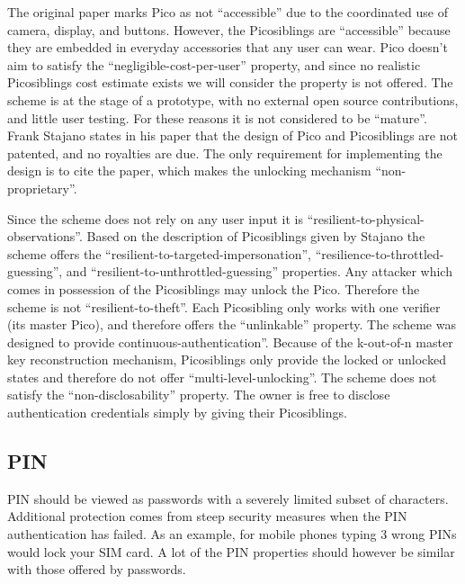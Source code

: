 	The original paper marks Pico as not ``accessible'' due to the coordinated use of camera, display, and buttons. However, the Picosiblings are ``accessible'' because they are embedded in everyday accessories that any user can wear. Pico doesn't aim to satisfy the ``negligible-cost-per-user'' property, and since no realistic Picosiblings cost estimate exists we will consider the property is not offered. The scheme is at the stage of a prototype, with no external open source contributions, and little user testing. For these reasons it is not considered to be ``mature''. Frank Stajano states in his paper \cite{stajano2011pico} that the design of Pico and Picosiblings are not patented, and no royalties are due. The only requirement for implementing the design is to cite the paper, which makes the unlocking mechanism ``non-proprietary''.
	
	Since the scheme does not rely on any user input it is ``resilient-to-physical-observations''. Based on the description of Picosiblings given by Stajano \cite{stajano2011pico} the scheme offers the ``resilient-to-targeted-impersonation'', ``resilience-to-throttled-guessing'', and ``resilient-to-unthrottled-guessing'' properties. Any attacker which comes in possession of the Picosiblings may unlock the Pico. Therefore the scheme is not ``resilient-to-theft''. Each Picosibling only works with one verifier (its master Pico), and therefore offers the ``unlinkable'' property. The scheme was designed to provide continuous-authentication''. Because of the k-out-of-n master key reconstruction mechanism, Picosiblings only provide the locked or unlocked states and therefore do not offer ``multi-level-unlocking''. The scheme does not satisfy the ``non-disclosability'' property. The owner is free to disclose authentication credentials simply by giving their Picosiblings.
	
	\subsection{PIN}
	PIN should be viewed as passwords with a severely limited subset of characters. Additional protection comes from steep security measures when the PIN authentication has failed. As an example, for mobile phones typing 3 wrong PINs would lock your SIM card. A lot of the PIN properties should however be similar with those offered by passwords.
	
